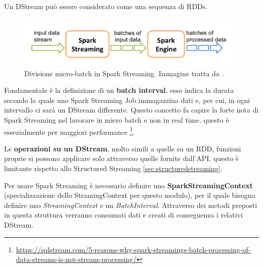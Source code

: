\documentclass[12pt,italian]{article}
\begin{document}
Un DStream può essere considerato come una sequenza di RDDs.
\begin{figure}[H]
	\centering 
	\includegraphics[width=1\linewidth]{img/sparkStreamingBatch.png}
	\caption{Divisione micro-batch in Spark Streaming. Immagine tratta da \cite{spark}.}
	\label{fig:SparkStreamingBatch}
\end{figure}
Fondamentale è la definizione di un \textbf{batch interval}, esso indica la durata secondo la quale uno Spark Streaming Job immagazzina dati e, per cui, in ogni intervallo ci sarà un DStream differente.
Questo concetto fa capire la forte nota di Spark Streaming nel lavorare in micro batch e non in real time, questo è essezialmente per maggiori performance \footnote{\url{https://sqlstream.com/5-reasons-why-spark-streamings-batch-processing-of-data-streams-is-not-stream-processing/}}.

Le \textbf{operazioni su un DStream}, molto simili a quelle su un RDD, funzioni proprie si possono applicare 
solo attraverso quelle fornite dall'API, questo è limitante rispetto allo Structured Streaming \ref{sec:structuredstreaming}.

\par Per usare Spark Streaming è necessario definire uno \textbf{SparkStreamingContext} (specializzazione dello StramingContext per questo modulo), per il quale bisogna definire uno \textit{StreamingContext} e un \textit{BatchInterval}.
Attraverso dei metodi preposti in questa struttura verranno consumati dati e creati di conseguenza i relativi DStream.
\end{document}
